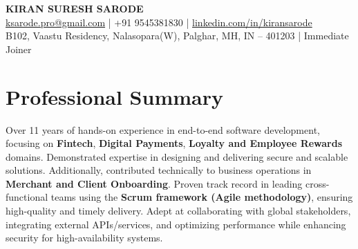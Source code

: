 \documentclass[12pt,a4paper]{article}
\begin{document}
\begin{center}
    {\Large \textbf{KIRAN SURESH SARODE}}\\
    \vspace{2pt}
    \href{mailto:ksarode.pro@gmail.com}{ksarode.pro@gmail.com} \quad | \quad +91 9545381830 \quad | \quad 
    \href{https://www.linkedin.com/in/kiransarode}{linkedin.com/in/kiransarode}\\
    \vspace{1pt}
    \footnotesize
    B102, Vaastu Residency, Nalasopara(W), Palghar, MH, IN -- 401203 \quad | \quad Immediate Joiner
\end{center}

\section*{Professional Summary}
Over 11 years of hands-on experience in end-to-end software development, focusing on \textbf{Fintech}, \textbf{Digital Payments}, \textbf{Loyalty and Employee Rewards} domains. Demonstrated expertise in designing and delivering secure and scalable solutions. Additionally, contributed technically to business operations in \textbf{Merchant and Client Onboarding}. Proven track record in leading cross-functional teams using the \textbf{Scrum framework (Agile methodology)}, ensuring high-quality and timely delivery. Adept at collaborating with global stakeholders, integrating external APIs/services, and optimizing performance while enhancing security for high-availability systems.

\end{document}
